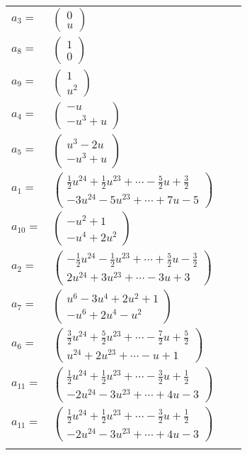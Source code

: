 \documentclass[1p]{elsarticle_modified}
\theoremstyle{definition}
\begin{document}
\begin{tabular}{m{7pt} m{180pt} m{7pt} m{180pt} }
\flushright $a_{3}=$&$\begin{pmatrix}0\\u\end{pmatrix}$ \\
\flushright $a_{8}=$&$\begin{pmatrix}1\\0\end{pmatrix}$ \\
\flushright $a_{9}=$&$\begin{pmatrix}1\\u^2\end{pmatrix}$ \\
\flushright $a_{4}=$&$\begin{pmatrix}- u\\- u^3+u\end{pmatrix}$ \\
\flushright $a_{5}=$&$\begin{pmatrix}u^3-2 u\\- u^3+u\end{pmatrix}$ \\
\flushright $a_{1}=$&$\begin{pmatrix}\frac{1}{2} u^{24}+\frac{1}{2} u^{23}+\cdots-\frac{5}{2} u+\frac{3}{2}\\-3 u^{24}-5 u^{23}+\cdots+7 u-5\end{pmatrix}$ \\
\flushright $a_{10}=$&$\begin{pmatrix}- u^2+1\\- u^4+2 u^2\end{pmatrix}$ \\
\flushright $a_{2}=$&$\begin{pmatrix}-\frac{1}{2} u^{24}-\frac{1}{2} u^{23}+\cdots+\frac{5}{2} u-\frac{3}{2}\\2 u^{24}+3 u^{23}+\cdots-3 u+3\end{pmatrix}$ \\
\flushright $a_{7}=$&$\begin{pmatrix}u^6-3 u^4+2 u^2+1\\- u^6+2 u^4- u^2\end{pmatrix}$ \\
\flushright $a_{6}=$&$\begin{pmatrix}\frac{3}{2} u^{24}+\frac{5}{2} u^{23}+\cdots-\frac{7}{2} u+\frac{5}{2}\\u^{24}+2 u^{23}+\cdots- u+1\end{pmatrix}$ \\
\flushright $a_{11}=$&$\begin{pmatrix}\frac{1}{2} u^{24}+\frac{1}{2} u^{23}+\cdots-\frac{3}{2} u+\frac{1}{2}\\-2 u^{24}-3 u^{23}+\cdots+4 u-3\end{pmatrix}$\\ \flushright $a_{11}=$&$\begin{pmatrix}\frac{1}{2} u^{24}+\frac{1}{2} u^{23}+\cdots-\frac{3}{2} u+\frac{1}{2}\\-2 u^{24}-3 u^{23}+\cdots+4 u-3\end{pmatrix}$\\&\end{tabular}
\end{document}
